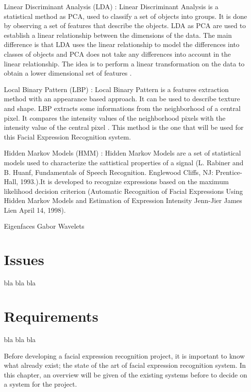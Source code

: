 \noindent Linear Discriminant Analysis (LDA) : Linear Discriminant Analysis is a statistical method as PCA, used to classify a set of objects into groups. It is done by observing a set of features that describe the objects. LDA as PCA are used to establish a linear relationship between the dimensions of the data. The main difference is that LDA uses the linear relationship to model the differences into classes of objects and PCA does not take any differences into account in the linear relationship. The idea is to perform a linear transformation on the data to obtain a lower dimensional set of features \cite{GAN08}.
\newline

\noindent Local Binary Pattern (LBP) : Local Binary Pattern is a features extraction method with an appearance based approach. It can be used to describe texture and shape. LBP extracts some informations from the neighborhood of a central pixel. It compares the intensity values of the neighborhood pixels with the intensity value of the central pixel  \cite{GAN08}. This method is the one that will be used for this Facial Expression Recognition system.
\newline

\noindent Hidden Markov Models (HMM) : Hidden Markov Models are a set of statistical models used to characterize the sattistical properties of a signal (L. Rabiner and B. Huanf, Fundamentals of Speech Recognition. Englewood Cliffs, NJ: Prentice-Hall, 1993.).It is developed to recognize expressions based on the maximum likelihood decision criterion (Automatic Recognition of Facial Expressions Using Hidden Markov Models and Estimation of Expression Intensity Jenn-Jier James Lien April 14, 1998).
\newline

\noindent Eigenfaces
\newline
\noindent Gabor Wavelets
\newline

\section{Issues}

\noindent bla bla bla
\newline

\section{Requirements}

\noindent bla bla bla
\newline









\noindent Before developing a facial expression recognition project, it is important to know what already exist; the state of the art of facial expression recognition system. In this chapter, an overview will be given of the existing systems before to decide on a system for the project.
\newline
